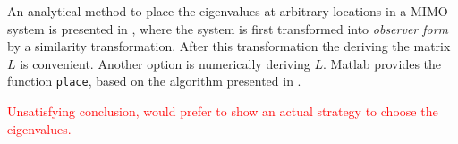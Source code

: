 An analytical method to place the eigenvalues at arbitrary locations in a MIMO system is presented in \cite[Section 4.2 B]{Antsaklis2006LinearProcessing}, where the system is first transformed into \textit{observer form} by a similarity transformation. After this transformation the deriving the matrix $L$ is convenient. Another option is numerically deriving $L$. Matlab provides the function \texttt{place}, based on the algorithm presented in \cite{Kautsky1985KautskyNV85}.

\textcolor{red}{Unsatisfying conclusion, would prefer to show an actual strategy to choose the eigenvalues.}


